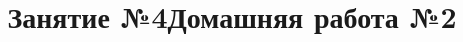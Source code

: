 \newpage
\title{Занятие №4}
\begin{listofex}
	\item {}
	\item {}
	\item {}
	\item {}
	\item {}
\end{listofex}
\newpage
\title{Домашняя работа №2}
\begin{listofex}
	\item {}
	\item {}
	\item {}
	\item {}
	\item {}
	\item {}
	\item {}
	\item {}
\end{listofex}
%
%
%
%
